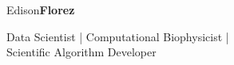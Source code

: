 
\begin{center}
    {\fontsize{50}{40}\selectfont Edison\bf Florez}

    \Large{
        Data Scientist | Computational Biophysicist | \\
        Scientific Algorithm Developer
    }
\end{center}

